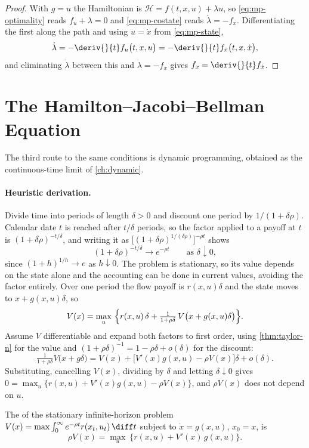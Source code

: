 \begin{proof}
	With $g=u$ the Hamiltonian is $\mathcal{H}=f(t,x,u)+\lambda u$, so
	\eqref{eq:mp-optimality} reads $f_u+\lambda=0$ and \eqref{eq:mp-costate} reads
	$\dot\lambda=-f_x$. Differentiating the first along the path and using
	$u=\dot x$ from \eqref{eq:mp-state},
	\[
		\dot\lambda=-\deriv{}{t}f_u\bigl(t,x,u\bigr)
		=-\deriv{}{t}f_{\dot x}\bigl(t,x,\dot x\bigr),
	\]
	and eliminating $\dot\lambda$ between this and $\dot\lambda=-f_x$ gives
	$f_x=\deriv{}{t}f_{\dot x}$.
\end{proof}

\section{The Hamilton--Jacobi--Bellman Equation}\label{sec:ct-hjb}

The third route to the same conditions is dynamic programming, obtained as the
continuous-time limit of \autoref{ch:dynamic}.

\paragraph{Heuristic derivation.} Divide time into periods of length $\delta>0$
and discount one period by $1/(1+\delta\rho)$. Calendar date $t$ is reached after
$t/\delta$ periods, so the factor applied to a payoff at $t$ is
$(1+\delta\rho)^{-t/\delta}$, and writing it as
$\bigl[(1+\delta\rho)^{1/(\delta\rho)}\bigr]^{-\rho t}$ shows
\[
	(1+\delta\rho)^{-t/\delta}\longrightarrow e^{-\rho t}
	\qquad\text{as }\delta\downarrow0,
\]
since $(1+h)^{1/h}\to e$ as $h\downarrow0$. The problem is stationary, so its
value depends on the state alone and the accounting can be done in current
values, avoiding the factor entirely. Over one period the flow payoff is
$r(x,u)\delta$ and the state moves to $x+g(x,u)\delta$, so
\[
	V(x)=\max_{u}\ \Bigl\{r(x,u)\,\delta
	+\tfrac{1}{1+\rho\delta}\,V\bigl(x+g(x,u)\delta\bigr)\Bigr\}.
\]
Assume $V$ differentiable and expand both factors to first order, using
\autoref{thm:taylor-n} for the value and
$(1+\rho\delta)^{-1}=1-\rho\delta+o(\delta)$ for the discount:
\[
	\tfrac{1}{1+\rho\delta}V\bigl(x+g\delta\bigr)
	=V(x)+\bigl[V'(x)g(x,u)-\rho V(x)\bigr]\delta+o(\delta).
\]
Substituting, cancelling $V(x)$, dividing by $\delta$ and letting
$\delta\downarrow0$ gives
$0=\max_u\{r(x,u)+V'(x)g(x,u)-\rho V(x)\}$, and $\rho V(x)$ does not depend on
$u$.

\begin{definition}\label{def:hjb}
	The  of the stationary infinite-horizon problem
	$V(x)=\max\int_0^{\infty}e^{-\rho t}r(x_t,u_t)\,\diff t$ subject to
	$\dot x=g(x,u)$, $x_0=x$, is
	\begin{equation}\label{eq:hjb}
		\rho V(x)=\max_{u}\ \bigl\{r(x,u)+V'(x)\,g(x,u)\bigr\}.
	\end{equation}
\end{definition}


